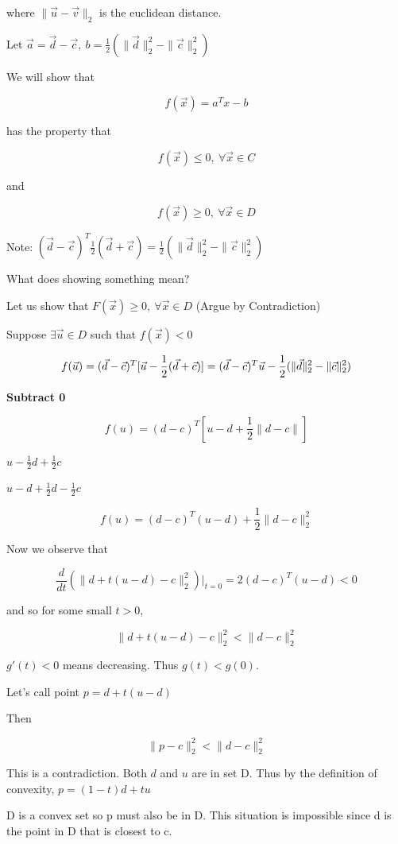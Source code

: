 \documentclass[11pt]{article}
\begin{document}
where \(\| \vec u - \vec v\|_2\) is the euclidean distance.


Let \(\vec a = \vec d - \vec c, \ b = \frac{1}{2}(\| \vec d \|_2^2 - \| \vec c \|_2^2)\)

We will show that

$$
f(\vec x) = a^T x - b
$$

has the property that

$$
f(\vec x) \leq 0, \ \forall \vec x \in C
$$

and

$$
f(\vec x) \geq 0, \ \forall \vec x \in D
$$

Note: \((\vec d - \vec c)^T \frac{1}{2}(\vec d + \vec c) = \frac{1}{2}(\| \vec d
\|_2^2 - \| \vec c \|_2^2)\)

What does showing something mean?

Let us show that \(F(\vec x) \geq 0, \ \forall \vec x \in D\) (Argue by
Contradiction)


Suppose \(\exists \vec{u} \in D\) such that \(f(\vec{x}) < 0\)

$$f(\vec{u}) = (\vec{d} - \vec{c})^T [\vec{u} - \frac{1}{2} (\vec{d} +
\vec{c})]\\
= (\vec{d} - \vec{c})^T \vec{u} - \frac{1}{2}(\| \vec{d}\|_2^2 - \| \vec{c}\|_2^2)$$

\textbf{Subtract 0}

$$
f(u) = (d - c)^T [u - d + \frac{1}{2} \| d - c\|]
$$

\(u - \frac{1}{2}d + \frac{1}{2} c\)

\(u - d + \frac{1}{2} d - \frac{1}{2} c\)

$$
f(u) = (d - c)^T (u - d) + \frac{1}{2} \| d - c \|_2^2
$$

Now we observe that

$$
\frac{d}{dt}(\| d + t (u - d) - c \|_2^2) |_{t = 0} = 2 (d - c)^T (u - d) < 0
$$

and so for some small \(t > 0\),

$$
 \| d + t(u - d) - c \|_2^2 < \| d - c\|_2^2
$$

\(g'(t) < 0\) means decreasing. Thus \(g(t) < g(0)\).

Let's call point \(p = d + t (u - d)\)

Then

$$
\| p - c\|_2^2 < \| d - c\|_2^2
$$

This is a contradiction. Both \(d\) and \(u\) are in set D. Thus by the definition
of convexity, \(p = (1 - t) d + tu\)

D is a convex set so p must also be in D. This situation is impossible since d
is the point in D that is closest to c.
\end{document}
